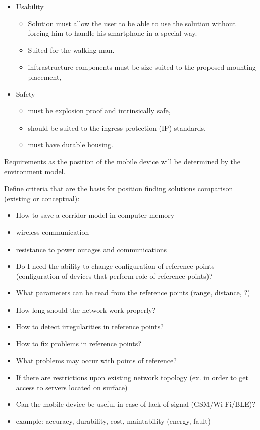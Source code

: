 \documentclass[../main.tex]{subfiles}
\begin{document}
\begin{itemize}
	\item Usability
	\begin{itemize}
		\item Solution must allow the user to be able to use the solution without forcing him to handle his smartphone in a special way.
		\item Suited for the walking man.
		\item inftrastructure components must be size suited to the proposed mounting placement,
	\end{itemize}
	\item Safety
	\begin{itemize}
		\item must be explosion proof and intrinsically safe,
		\item should be suited to the ingress protection (IP) standards,
		\item must have durable housing.
	\end{itemize}
\end{itemize}


Requirements as the position of the mobile device will be determined by the environment model.

Define criteria that are the basis for position finding solutions comparison (existing or conceptual):
\begin{itemize}
	\item How to save a corridor model in computer memory
	\item wireless communication
	\item resistance to power outages and communications
	\item Do I need the ability to change configuration of reference points (configuration of devices that perform role of reference points)?
	\item What parameters can be read from the reference points (range, distance, ?)
	\item How long should the network work properly?
	\item How to detect irregularities in reference points?
	\item How to fix problems in reference points?
	\item What problems may occur with points of reference?
	\item If there are restrictions upon existing network topology (ex. in order to get access to servers located on surface)
	\item Can the mobile device be useful in case of lack of signal (GSM/Wi-Fi/BLE)?
	\item example: accuracy, durability, cost, maintability (energy, fault)
\end{itemize}
\end{document}
